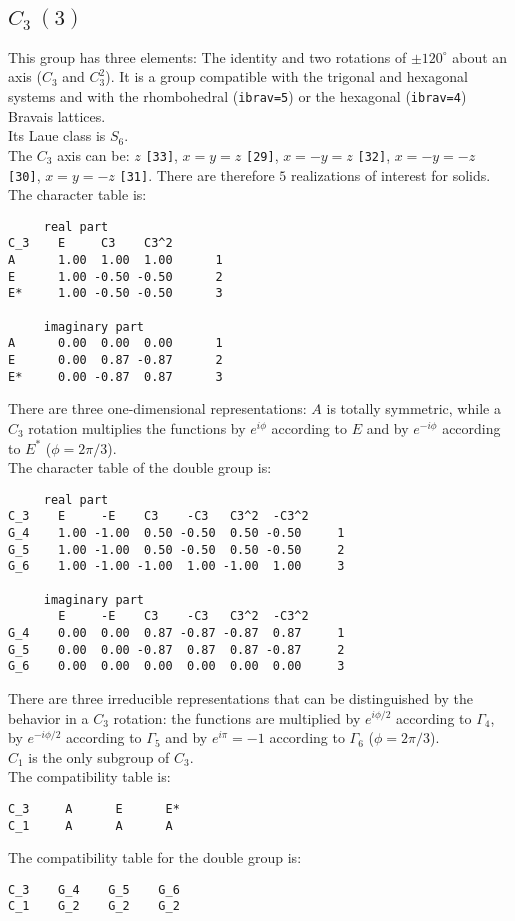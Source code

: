 \documentclass[12pt,a4paper]{article}
\begin{document}
\newpage
\subsection{\color{web-blue}$C_3\ (3)$}
This group has three elements: The identity and two rotations of $\pm120^\circ$ 
about an axis ($C_3$ and $C_3^2$).
It is a group compatible with the trigonal and hexagonal systems and with the
rhombohedral (\texttt{ibrav=5}) or the hexagonal (\texttt{ibrav=4}) Bravais 
lattices. \\
Its Laue class is $S_6$. \\
The $C_3$ axis can be: $z$ \texttt{[33]}, $x=y=z$ \texttt{[29]}, 
$x=-y=z$ \texttt{[32]}, $x=-y=-z$ \texttt{[30]}, $x=y=-z$ \texttt{[31]}.
There are therefore $5$ realizations of interest for solids. \\
The character table is:
\begin{verbatim}
     real part
C_3    E     C3    C3^2
A      1.00  1.00  1.00      1
E      1.00 -0.50 -0.50      2
E*     1.00 -0.50 -0.50      3

     imaginary part
A      0.00  0.00  0.00      1
E      0.00  0.87 -0.87      2
E*     0.00 -0.87  0.87      3 
\end{verbatim}
There are three one-dimensional representations: $A$ is totally symmetric, while
a $C_3$ rotation multiplies the functions by $e^{i\phi}$ according to $E$
and by $e^{-i\phi}$ according to $E^*$ ($\phi=2 \pi / 3$). \\
The character table of the double group is:
\begin{verbatim}
     real part
C_3    E     -E    C3    -C3   C3^2  -C3^2
G_4    1.00 -1.00  0.50 -0.50  0.50 -0.50     1
G_5    1.00 -1.00  0.50 -0.50  0.50 -0.50     2
G_6    1.00 -1.00 -1.00  1.00 -1.00  1.00     3

     imaginary part
       E     -E    C3    -C3   C3^2  -C3^2
G_4    0.00  0.00  0.87 -0.87 -0.87  0.87     1
G_5    0.00  0.00 -0.87  0.87  0.87 -0.87     2
G_6    0.00  0.00  0.00  0.00  0.00  0.00     3
\end{verbatim}
There are three irreducible representations that can be distinguished by the
behavior in a $C_3$ rotation: the functions are multiplied by $e^{i\phi/2}$ according
to $\Gamma_4$, by $e^{-i\phi/2}$ according to $\Gamma_5$ and by $e^{i\pi}=-1$ 
according to $\Gamma_6$ ($\phi=2 \pi / 3$). \\
$C_1$ is the only subgroup of $C_3$. \\
The compatibility table is:
\begin{verbatim}
C_3     A      E      E*  
C_1     A      A      A
\end{verbatim}
The compatibility table for the double group is:
\begin{verbatim}
C_3    G_4    G_5    G_6 
C_1    G_2    G_2    G_2
\end{verbatim}
\end{document}
